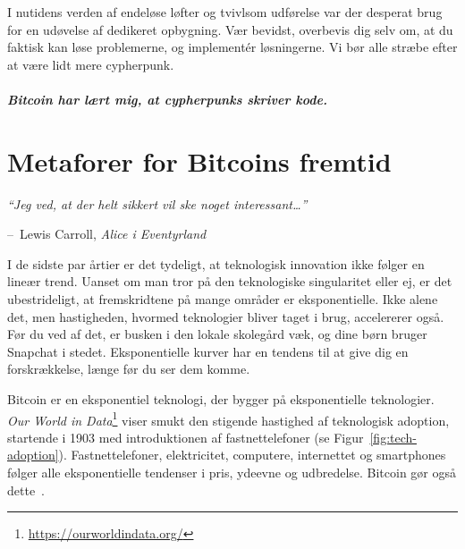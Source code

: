 \documentclass[paper=6in:9in,pagesize=pdftex,
               headinclude=on,footinclude=on,12pt]{scrbook}
\makeatletter
\newenvironment{chapquote}[2][4em]{\setlength{\@tempdima}{#1}%
   \def\chapquote@author{#2}%
   \parshape 1 \@tempdima \dimexpr\textwidth-2\@tempdima\relax%
   \itshape}{\par\normalfont\hfill--\ \chapquote@author\hspace*{\@tempdima}\par\bigskip}
\makeatother
\begin{document}
I nutidens verden af endeløse løfter og tvivlsom udførelse var der desperat brug for en udøvelse af dedikeret opbygning. Vær bevidst, overbevis dig selv om, at du faktisk kan løse problemerne, og implement\'er løsningerne. Vi bør alle stræbe efter at være lidt mere cypherpunk.\paragraph{Bitcoin har lært mig, at cypherpunks skriver kode.}%
%
%
%
%

\chapter{Metaforer for Bitcoins fremtid}
\label{les:21}

\begin{chapquote}{Lewis Carroll, \textit{Alice i Eventyrland}}
\enquote{Jeg ved, at der helt sikkert vil ske noget interessant\ldots}
\end{chapquote}

I de sidste par årtier er det tydeligt, at teknologisk innovation ikke følger en lineær trend. Uanset om man tror på den teknologiske singularitet eller ej, er det ubestrideligt, at fremskridtene på mange områder er eksponentielle. Ikke alene det, men hastigheden, hvormed teknologier bliver taget i brug, accelererer også. Før du ved af det, er busken i den lokale skolegård væk, og dine børn bruger Snapchat i stedet. Eksponentielle kurver har en tendens til at give dig en forskrækkelse, længe før du ser dem komme.

Bitcoin er en eksponentiel teknologi, der bygger på eksponentielle teknologier. \textit{Our World in Data}\footnote{\url{https://ourworldindata.org/}} viser smukt den stigende hastighed af teknologisk adoption, startende i 1903 med introduktionen af fastnettelefoner (se Figur~\ref{fig:tech-adoption}). Fastnettelefoner, elektricitet, computere, internettet og smartphones følger alle eksponentielle tendenser i pris, ydeevne og udbredelse. Bitcoin gør også dette~\cite{tech-adoption}.
\end{document}
